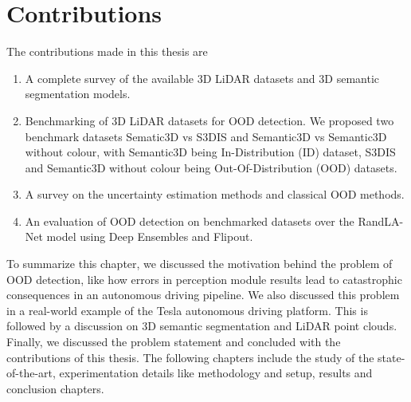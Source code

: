 \section{Contributions}
The contributions made in this thesis are
\begin{enumerate}
    \item A complete survey of the available 3D LiDAR datasets and 3D semantic segmentation models.
    \item Benchmarking of 3D LiDAR datasets for OOD detection. We proposed two benchmark datasets Sematic3D vs S3DIS and Semantic3D vs Semantic3D without colour, with Semantic3D being In-Distribution (ID) dataset, S3DIS and Semantic3D without colour being Out-Of-Distribution (OOD) datasets.
    \item A survey on the uncertainty estimation methods and classical OOD methods.
    \item An evaluation of OOD detection on benchmarked datasets over the RandLA-Net model using Deep Ensembles and Flipout.
\end{enumerate}

To summarize this chapter, we discussed the motivation behind the problem of OOD detection, like
how errors in perception module results lead to catastrophic consequences in an autonomous driving pipeline.
We also discussed this problem in a real-world example of the Tesla autonomous driving platform.
This is followed by a discussion on 3D semantic segmentation and LiDAR point clouds.
Finally, we discussed the problem statement and concluded with the contributions of this thesis.
The following chapters include the study of the state-of-the-art, experimentation details like methodology and setup, results and conclusion chapters.




